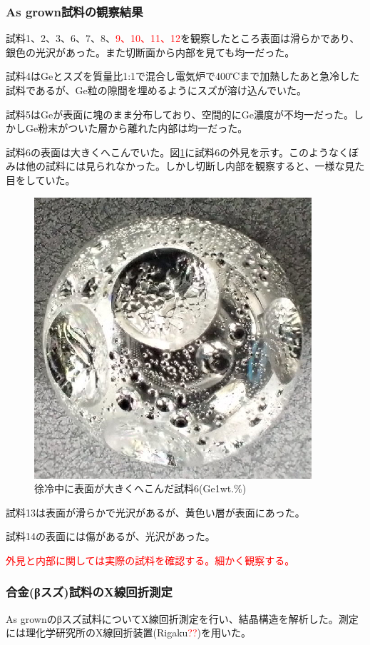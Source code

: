 \subsubsection{As grown試料の観察結果}
試料1、2、3、6、7、8、\textcolor{red}{9、10、11、12}を観察したところ表面は滑らかであり、銀色の光沢があった。また切断面から内部を見ても均一だった。

試料4はGeとスズを質量比1:1で混合し電気炉で400℃まで加熱したあと急冷した試料であるが、Ge粒の隙間を埋めるようにスズが溶け込んでいた。

試料5はGeが表面に塊のまま分布しており、空間的にGe濃度が不均一だった。しかしGe粉末がついた層から離れた内部は均一だった。

試料6の表面は大きくへこんでいた。図\ref{fig:sample6_asgrown}に試料6の外見を示す。このようなくぼみは他の試料には見られなかった。しかし切断し内部を観察すると、一様な見た目をしていた。
\begin{figure}[!h]
    \begin{center}
   \includegraphics[width=0.4\hsize]{samples/sample6_asgrown.eps}
  \end{center}
  \caption{徐冷中に表面が大きくへこんだ試料6(Ge1wt.\%)}
  \label{fig:sample6_asgrown}
\end{figure}

試料13は表面が滑らかで光沢があるが、黄色い層が表面にあった。

試料14の表面には傷があるが、光沢があった。

\textcolor{red}{外見と内部に関しては実際の試料を確認する。細かく観察する。}

\subsubsection{合金(βスズ)試料のX線回折測定}
As grownのβスズ試料についてX線回折測定を行い、結晶構造を解析した。測定には理化学研究所のX線回折装置(Rigaku\textcolor{red}{??})を用いた。

